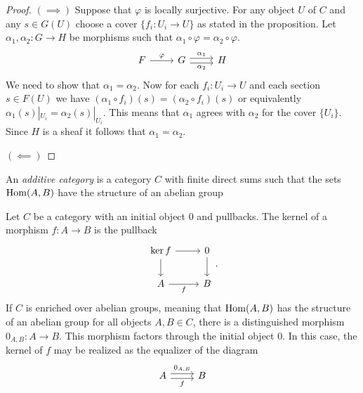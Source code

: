 \begin{proof}
	$(\implies)$ Suppose that $\varphi$ is locally surjective. For any object $U$ of $C$ and any $s \in G(U)$ choose a cover $\{f_i: U_i \to U\}$ as stated in the proposition. Let $\alpha_1, \alpha_2: G \to H$ be morphisms such that $\alpha_1 \circ \varphi = \alpha_2 \circ \varphi$.
	\[
		\begin{tikzcd}
			F & G & H
			\arrow["\varphi", from=1-1, to=1-2]
			\arrow["{\alpha_2}"', shift right=1, from=1-2, to=1-3]
			\arrow["{\alpha_1}", shift left=1, from=1-2, to=1-3]
		\end{tikzcd}\]
	We need to show that $\alpha_1 = \alpha_2$.  Now for each $f_i: U_i \to U$ and each section $s \in F(U)$ we have $(\alpha_1 \circ f_i)(s) = (\alpha_2 \circ f_i)(s)$ or equivalently  $\alpha_1(s)|_{U_i} = \alpha_2(s)|_{U_i}$. This means that $\alpha_1$ agrees with $\alpha_2$ for the cover $\{U_i\}$. Since $H$ is a sheaf it follows that $\alpha_1 = \alpha_2$.\par
	$(\impliedby)$
\end{proof}

\begin{definition}
	An \textit{additive category} is a category $C$ with finite direct sums such that the sets $\operatorname{Hom}(A,B)$ have the structure of an abelian group
\end{definition}

\begin{definition}[Kernels]
	Let $C$ be a category with an initial object $0$ and pullbacks. The kernel of a morphism $f: A \to B$ is the pullback
	\[
		\begin{tikzcd}
			{\ker f} & 0 \\
			A & B
			\arrow[from=1-1, to=2-1]
			\arrow[from=1-1, to=1-2]
			\arrow["f"', from=2-1, to=2-2]
			\arrow[from=1-2, to=2-2]
		\end{tikzcd}.
	\]
	If $C$ is enriched over abelian groups, meaning that $\operatorname{Hom}(A,B)$ has the structure of an abelian group for all objects $A,B \in C$, there is a distinguished morphism $0_{A,B} : A \to B$. This morphism factors through the initial object $0$. In this case, the kernel of $f$ may be realized as the equalizer of the diagram
	\[
		\begin{tikzcd}
			A & B
			\arrow["f"', shift right=1, from=1-1, to=1-2]
			\arrow["{0_{A,B}}", shift left=1, from=1-1, to=1-2]
		\end{tikzcd}
	\]
\end{definition}

